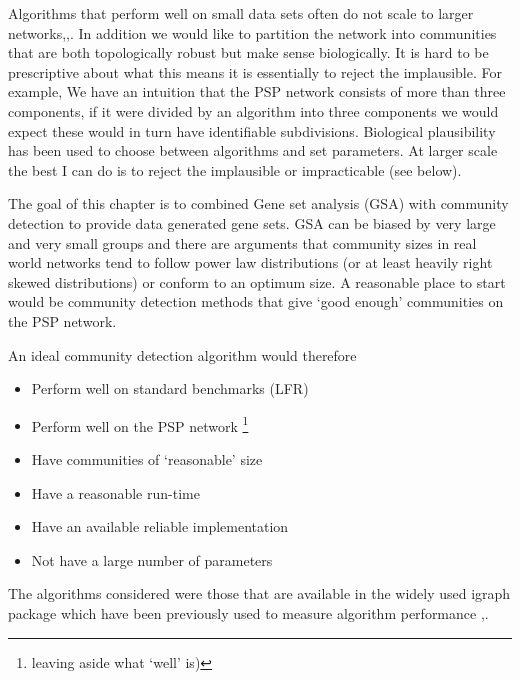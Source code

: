 Algorithms that perform well on small data sets often do not scale to larger networks\cite{girvan2002community},\cite{mclean2016improved},\cite{yang2016comparative}. In addition we would like to partition the network into communities that are both topologically robust but make sense biologically. It is hard to be prescriptive about what this means it is essentially to reject the implausible. For example, We have an intuition that the PSP network consists of more than three components, if it were divided by an algorithm into three components we would expect these would in turn have identifiable subdivisions. Biological plausibility\cite{pocklington2006organization} has been used to choose between algorithms and set parameters. At larger scale the best I can do is to reject the implausible or impracticable (see below). 

The goal of this chapter is to combined Gene set analysis (GSA) with community detection to provide data generated gene sets. GSA can be biased by very large and very small groups\cite{de2016statistical} and there are arguments that community sizes in real world networks tend to follow power law distributions (or at least heavily right skewed distributions)\cite{lancichinetti2008benchmark} or conform to an optimum size\cite{leskovec2010empirical}. A reasonable place to start would be community detection methods that give `good enough' communities on the PSP network. 


An ideal community detection algorithm would therefore

\begin{itemize}
    \item Perform well on standard benchmarks (LFR)
    \item Perform well on the PSP network \footnote{leaving aside what `well' is)}
    \item Have communities of `reasonable' size
    \item Have a reasonable run-time
    \item Have an available reliable implementation
    \item Not have a large number of parameters
\end{itemize}

The algorithms considered were those that are available in the widely used igraph package which have been previously used to measure algorithm performance \cite{yang2016comparative},\cite{de2014evaluating}.


